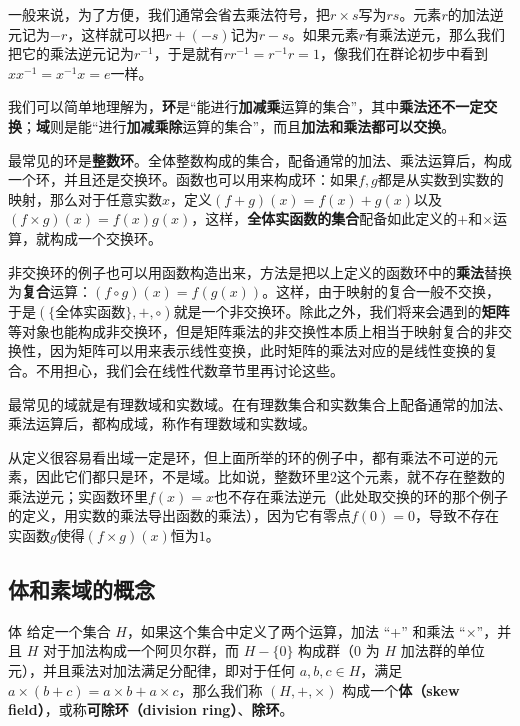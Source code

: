 一般来说，为了方便，我们通常会省去乘法符号，把$r\times s$写为$rs$。元素$r$的加法逆元记为$-r$，这样就可以把$r+(-s)$记为$r-s$。如果元素$r$有乘法逆元，那么我们把它的乘法逆元记为$r^{-1}$，于是就有$rr^{-1}=r^{-1}r=1$，像我们在群论初步中看到$xx^{-1}=x^{-1}x=e$一样。



我们可以简单地理解为，\textbf{环}是“能进行\textbf{加减乘}运算的集合”，其中\textbf{乘法还不一定交换}；\textbf{域}则是能“进行\textbf{加减乘除}运算的集合”，而且\textbf{加法和乘法都可以交换}。

最常见的环是\textbf{整数环}。全体整数构成的集合，配备通常的加法、乘法运算后，构成一个环，并且还是交换环。函数也可以用来构成环：如果$f, g$都是从实数到实数的映射，那么对于任意实数$x$，定义$(f+g)(x)=f(x)+g(x)$以及$(f\times g)(x)=f(x)g(x)$，这样，\textbf{全体实函数的集合}配备如此定义的$+$和$\times$运算，就构成一个交换环。

非交换环的例子也可以用函数构造出来，方法是把以上定义的函数环中的\textbf{乘法}替换为\textbf{复合}运算：$(f\circ g)(x)=f(g(x))$。这样，由于映射的复合一般不交换，于是$(\{\text{全体实函数}\}, +, \circ)$就是一个非交换环。除此之外，我们将来会遇到的\textbf{矩阵}等对象也能构成非交换环，但是矩阵乘法的非交换性本质上相当于映射复合的非交换性，因为矩阵可以用来表示线性变换，此时矩阵的乘法对应的是线性变换的复合。不用担心，我们会在线性代数章节里再讨论这些。

最常见的域就是有理数域和实数域。在有理数集合和实数集合上配备通常的加法、乘法运算后，都构成域，称作有理数域和实数域。

从定义很容易看出域一定是环，但上面所举的环的例子中，都有乘法不可逆的元素，因此它们都只是环，不是域。比如说，整数环里$2$这个元素，就不存在整数的乘法逆元；实函数环里$f(x)=x$也不存在乘法逆元（此处取交换的环的那个例子的定义，用实数的乘法导出函数的乘法），因为它有零点$f(0)=0$，导致不存在实函数$g$使得$(f\times g)(x)$恒为$1$。





\subsection{体和素域的概念}

\begin{definition}{体}\label{def_field_1}
给定一个集合 $H$，如果这个集合中定义了两个运算，加法 “+” 和乘法 “$\times$”，并且 $H$ 对于加法构成一个阿贝尔群，而 $H-\{0\}$ 构成群（$0$ 为 $H$ 加法群的单位元），并且乘法对加法满足分配律，即对于任何 $a, b, c\in H$，满足 $a\times(b+c)=a\times b+a\times c$，那么我们称 $(H, +, \times)$ 构成一个\textbf{体（skew field）}，或称\textbf{可除环（division ring）}、\textbf{除环}。
\end{definition}

